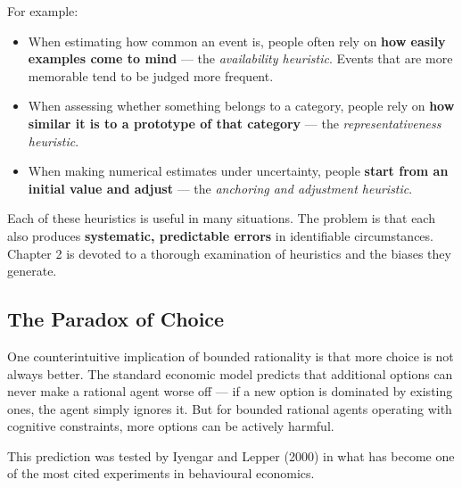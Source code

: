 \documentclass[12pt, letterpaper]{article}
\begin{document}
For example:
\begin{itemize}
\item When estimating how common an event is, people often rely on \textbf{how easily examples come to mind} --- the \textit{availability heuristic}. Events that are more memorable tend to be judged more frequent.
\item When assessing whether something belongs to a category, people rely on \textbf{how similar it is to a prototype of that category} --- the \textit{representativeness heuristic}.
\item When making numerical estimates under uncertainty, people \textbf{start from an initial value and adjust} --- the \textit{anchoring and adjustment heuristic}.
\end{itemize}

Each of these heuristics is useful in many situations. The problem is that each also produces \textbf{systematic, predictable errors} in identifiable circumstances. Chapter 2 is devoted to a thorough examination of heuristics and the biases they generate.

\medskip


\subsection{The Paradox of Choice}


One counterintuitive implication of bounded rationality is that more choice is not always better. The standard economic model predicts that additional options can never make a rational agent worse off --- if a new option is dominated by existing ones, the agent simply ignores it. But for bounded rational agents operating with cognitive constraints, more options can be actively harmful.

This prediction was tested by Iyengar and Lepper (2000) in what has become one of the most cited experiments in behavioural economics.
\end{document}
